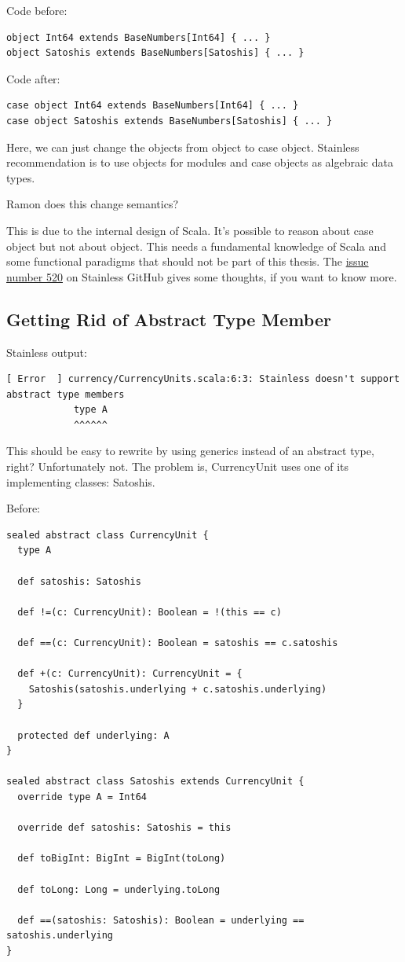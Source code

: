 \documentclass[runningheads]{llncs}
\newcommand{\todo}[1]{{\par \color{red}#1}}
\begin{document}
Code before:
\begin{lstlisting}[style=scala]
object Int64 extends BaseNumbers[Int64] { ... }
object Satoshis extends BaseNumbers[Satoshis] { ... }
\end{lstlisting}

Code after:
\begin{lstlisting}[style=scala]
case object Int64 extends BaseNumbers[Int64] { ... }
case object Satoshis extends BaseNumbers[Satoshis] { ... }
\end{lstlisting}

Here, we can just change the objects from object to case object.
Stainless recommendation is to use objects for modules and case objects as algebraic data types.

\todo{Ramon does this change semantics?}

This is due to the internal design of Scala.
It's possible to reason about case object but not about object.
This needs a fundamental knowledge of Scala and some functional paradigms that should not be part of this thesis.
The \href{https://github.com/epfl-lara/stainless/issues/520}{issue number 520} on Stainless GitHub gives some thoughts, if you want to know more.


\subsection{Getting Rid of Abstract Type Member}

Stainless output:
\begin{lstlisting}[style=stainless]
[ Error  ] currency/CurrencyUnits.scala:6:3: Stainless doesn't support abstract type members
            type A
            ^^^^^^
\end{lstlisting}

This should be easy to rewrite by using generics instead of an abstract type, right?
Unfortunately not.
The problem is, CurrencyUnit uses one of its implementing classes: Satoshis.

Before:
\begin{lstlisting}[style=scala]
sealed abstract class CurrencyUnit {
  type A

  def satoshis: Satoshis

  def !=(c: CurrencyUnit): Boolean = !(this == c)

  def ==(c: CurrencyUnit): Boolean = satoshis == c.satoshis

  def +(c: CurrencyUnit): CurrencyUnit = {
    Satoshis(satoshis.underlying + c.satoshis.underlying)
  }

  protected def underlying: A
}

sealed abstract class Satoshis extends CurrencyUnit {
  override type A = Int64

  override def satoshis: Satoshis = this

  def toBigInt: BigInt = BigInt(toLong)

  def toLong: Long = underlying.toLong

  def ==(satoshis: Satoshis): Boolean = underlying == satoshis.underlying
}
\end{lstlisting}
\end{document}
